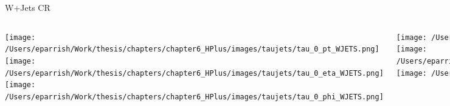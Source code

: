 \documentclass[aspectratio=169,xcolor=table]{beamer}
\begin{document}
    \begin{frame}[t]{W+Jets CR}
      \begin{columns}[t]
          \texttt{[image: /Users/eparrish/Work/thesis/chapters/chapter6\_HPlus/images/taujets/tau\_0\_pt\_WJETS.png]}
          \texttt{[image: /Users/eparrish/Work/thesis/chapters/chapter6\_HPlus/images/taujets/tau\_0\_eta\_WJETS.png]}
          \texttt{[image: /Users/eparrish/Work/thesis/chapters/chapter6\_HPlus/images/taujets/tau\_0\_phi\_WJETS.png]}

          \texttt{[image: /Users/eparrish/Work/thesis/chapters/chapter6\_HPlus/images/taujets/tau\_0\_upsilon\_WJETS.png]}
          \texttt{[image: /Users/eparrish/Work/thesis/chapters/chapter6\_HPlus/images/taujets/tau\_0\_charged\_tracks\_0\_pt\_WJETS.png]}
          \texttt{[image: /Users/eparrish/Work/thesis/chapters/chapter6\_HPlus/images/taujets/n\_jets\_WJETS.png]}

          \texttt{[image: /Users/eparrish/Work/thesis/chapters/chapter6\_HPlus/images/taujets/met\_et\_WJETS.png]}
          \texttt{[image: /Users/eparrish/Work/thesis/chapters/chapter6\_HPlus/images/taujets/met\_phi\_WJETS.png]}
          \texttt{[image: /Users/eparrish/Work/thesis/chapters/chapter6\_HPlus/images/taujets/n\_bjets\_DL1r\_FixedCutBEff\_70\_WJETS.png]}

          \texttt{[image: /Users/eparrish/Work/thesis/chapters/chapter6\_HPlus/images/taujets/bjet\_0\_pt\_WJETS.png]}
          \texttt{[image: /Users/eparrish/Work/thesis/chapters/chapter6\_HPlus/images/taujets/bjet\_0\_eta\_WJETS.png]}
          \texttt{[image: /Users/eparrish/Work/thesis/chapters/chapter6\_HPlus/images/taujets/bjet\_0\_phi\_WJETS.png]}

      \end{columns}
    \end{frame}
\end{document}
